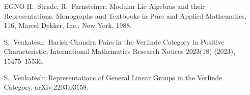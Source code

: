 \documentclass[11pt,a4paper,reqno]{amsart}
\theoremstyle{definition}
\numberwithin{equation}{section}
\begin{document}
\begin{thebibliography}{EGNO}
 H.~Strade, R.~Farnsteiner: Modular Lie Algebras and their Representations. Monographs and Textbooks in Pure and Applied Mathematics, 116, Marcel Dekker, Inc., New York, 1988.

 S.~Venkatesh: Harish-Chandra Pairs in the Verlinde Category in Positive Characteristic, International Mathematics Research Notices 2023(18) (2023), 15475--15536.

 S.~Venkatesh: Representations of General Linear Groups in the Verlinde Category. arXiv:2203.03158.

\end{thebibliography}
\end{document}
